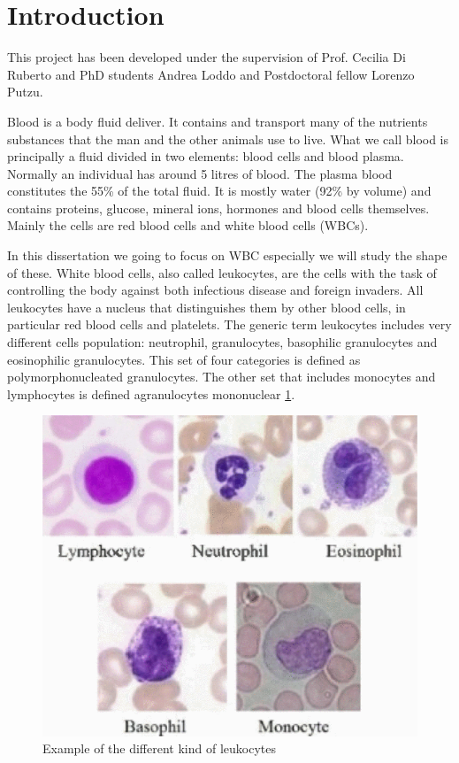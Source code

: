 
\chapter*{Introduction}
This project has been developed under the supervision of Prof. Cecilia Di Ruberto and PhD students Andrea Loddo and Postdoctoral fellow Lorenzo Putzu.

\bigskip


Blood is a body fluid deliver. It contains and transport many of the nutrients substances that the man and the other animals use to live. What we call blood is principally a fluid divided in two elements: blood cells and blood plasma. Normally an individual has around 5 litres of blood. The plasma blood constitutes the 55\% of the total fluid. It is mostly water (92\% by volume) and contains proteins, glucose, mineral ions, hormones and blood cells themselves.\cite{website:wiki} Mainly the cells are red blood cells and white blood cells (WBCs). 

\bigskip

In this dissertation we going to focus on WBC especially we will study the shape of these. White blood cells, also called leukocytes, are the cells with the task of controlling the body against both infectious disease and foreign invaders. All leukocytes have a nucleus that distinguishes them by other blood cells, in particular red blood cells and platelets. The generic term leukocytes includes very different cells population: neutrophil, granulocytes, basophilic granulocytes and eosinophilic granulocytes. This set of four categories is defined as   polymorphonucleated granulocytes. The other set that includes monocytes and lymphocytes is defined agranulocytes mononuclear \ref{fig:kindLeuko}.
\begin{figure}
	\begin{center}
		\centering
		\includegraphics[scale=0.5]{img/leuko.png}
		\caption{Example of the different kind of leukocytes\cite{ann17}}
		\label{fig:kindLeuko}
	\end{center}
\end{figure}

